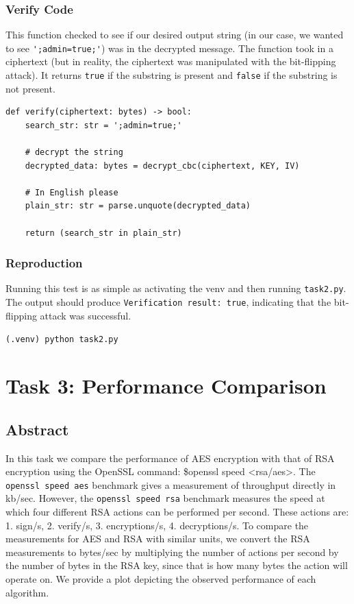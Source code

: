 \documentclass[11pt]{article}
\begin{document}
\subsubsection*{Verify Code}

This function checked to see if our desired output string (in our case, we wanted to see \verb|';admin=true;'|) was in the decrypted message. The function took in a ciphertext (but in reality, the ciphertext was manipulated with the bit-flipping attack). It returns \verb|true| if the substring is present and \verb|false| if the substring is not present.

\begin{lstlisting}
def verify(ciphertext: bytes) -> bool:
    search_str: str = ';admin=true;'

    # decrypt the string  
    decrypted_data: bytes = decrypt_cbc(ciphertext, KEY, IV)

    # In English please
    plain_str: str = parse.unquote(decrypted_data)

    return (search_str in plain_str)

\end{lstlisting}

\subsubsection*{Reproduction}

Running this test is as simple as activating the venv and then running \verb|task2.py|. The output should produce \verb|Verification result: true|, indicating that the bit-flipping attack was successful.

\verb|(.venv) python task2.py|

\section*{Task 3: Performance Comparison}
\subsection*{Abstract}

In this task we compare the performance of AES encryption with that of RSA encryption using the OpenSSL command: \$openssl speed <rsa/aes>. The \verb|openssl speed aes| benchmark gives a measurement of throughput directly in kb/sec. However, the \verb|openssl speed rsa| benchmark measures the speed at which four different RSA actions can be performed per second. These actions are: 1. sign/s, 2. verify/s, 3. encryptions/s, 4. decryptions/s. To compare the measurements for AES and RSA with similar units, we convert the RSA measurements to bytes/sec by multiplying the number of actions per second by the number of bytes in the RSA key, since that is how many bytes the action will operate on. We provide a plot depicting the observed performance of each algorithm.
\end{document}
